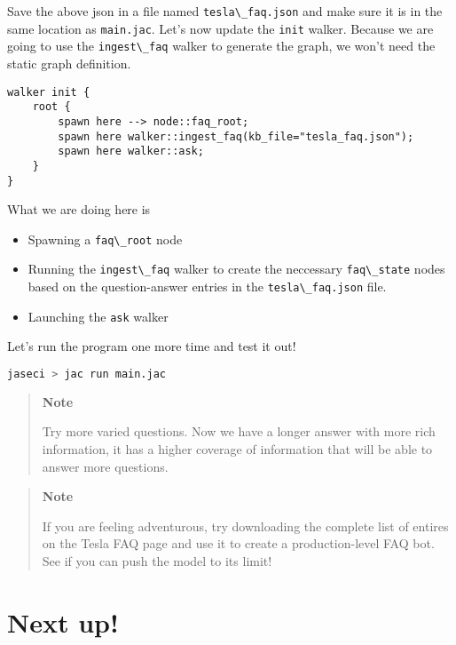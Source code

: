 Save the above json in a file named
\passthrough{\lstinline!tesla\_faq.json!} and make sure it is in the
same location as \passthrough{\lstinline!main.jac!}. Let's now update
the \passthrough{\lstinline!init!} walker. Because we are going to use
the \passthrough{\lstinline!ingest\_faq!} walker to generate the graph,
we won't need the static graph definition.

\begin{lstlisting}
walker init {
    root {
        spawn here --> node::faq_root;
        spawn here walker::ingest_faq(kb_file="tesla_faq.json");
        spawn here walker::ask;
    }
}
\end{lstlisting}

What we are doing here is

\begin{itemize}
\tightlist
\item
  Spawning a \passthrough{\lstinline!faq\_root!} node
\item
  Running the \passthrough{\lstinline!ingest\_faq!} walker to create the
  neccessary \passthrough{\lstinline!faq\_state!} nodes based on the
  question-answer entries in the
  \passthrough{\lstinline!tesla\_faq.json!} file.
\item
  Launching the \passthrough{\lstinline!ask!} walker
\end{itemize}

Let's run the program one more time and test it out!

\begin{lstlisting}[language=bash]
jaseci > jac run main.jac
\end{lstlisting}

\begin{quote}
\textbf{Note}

Try more varied questions. Now we have a longer answer with more rich
information, it has a higher coverage of information that will be able
to answer more questions.
\end{quote}

\begin{quote}
\textbf{Note}

If you are feeling adventurous, try downloading the complete list of
entires on the Tesla FAQ page and use it to create a production-level
FAQ bot. See if you can push the model to its limit!
\end{quote}

\hypertarget{next-up}{%
\section{Next up!}\label{next-up}}


